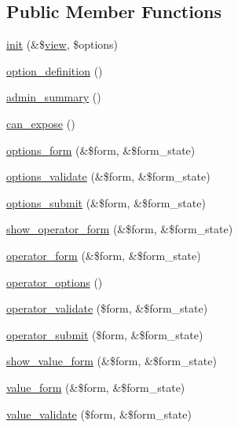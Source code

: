 \subsection*{Public Member Functions}
\begin{CompactItemize}
\item 
\hyperlink{classviews__handler__filter_8bae65467710eb5f6cf6c2c46bd51c7b}{init} (\&\$\hyperlink{classview}{view}, \$options)
\item 
\hyperlink{classviews__handler__filter_053c9173084f1409a92eb390854ec304}{option\_\-definition} ()
\item 
\hyperlink{classviews__handler__filter_655263cd0b73188eec064b9a9743fe4c}{admin\_\-summary} ()
\item 
\hyperlink{classviews__handler__filter_f0e5810a2a2f194cd6af0fca9c858756}{can\_\-expose} ()
\item 
\hyperlink{classviews__handler__filter_f14c69367162057a32709a6340de0988}{options\_\-form} (\&\$form, \&\$form\_\-state)
\item 
\hyperlink{classviews__handler__filter_1156751e912662ce47ad680cbe2c03a3}{options\_\-validate} (\&\$form, \&\$form\_\-state)
\item 
\hyperlink{classviews__handler__filter_d93c8118dcd40fc5194a806e2986a300}{options\_\-submit} (\&\$form, \&\$form\_\-state)
\item 
\hyperlink{classviews__handler__filter_d24ef0dda8c7441b9b471aec9052a0a5}{show\_\-operator\_\-form} (\&\$form, \&\$form\_\-state)
\item 
\hyperlink{classviews__handler__filter_8c77c0a8bba8c3ceceae8950fc7b1121}{operator\_\-form} (\&\$form, \&\$form\_\-state)
\item 
\hyperlink{classviews__handler__filter_cbd69b92e9199530a54069c79368db7f}{operator\_\-options} ()
\item 
\hyperlink{classviews__handler__filter_63a138e4e07e0537e2ece65bc7a9784e}{operator\_\-validate} (\$form, \&\$form\_\-state)
\item 
\hyperlink{classviews__handler__filter_e9dbe89c9a8f6017492217c25d81ba53}{operator\_\-submit} (\$form, \&\$form\_\-state)
\item 
\hyperlink{classviews__handler__filter_37f4961abdb70886be8229fbfa35038a}{show\_\-value\_\-form} (\&\$form, \&\$form\_\-state)
\item 
\hyperlink{classviews__handler__filter_9168b39edae84b20e01a3fd0d810ba66}{value\_\-form} (\&\$form, \&\$form\_\-state)
\item 
\hyperlink{classviews__handler__filter_55b051bcd047b7251e6dbbece8e0a081}{value\_\-validate} (\$form, \&\$form\_\-state)

\end{CompactItemize}
